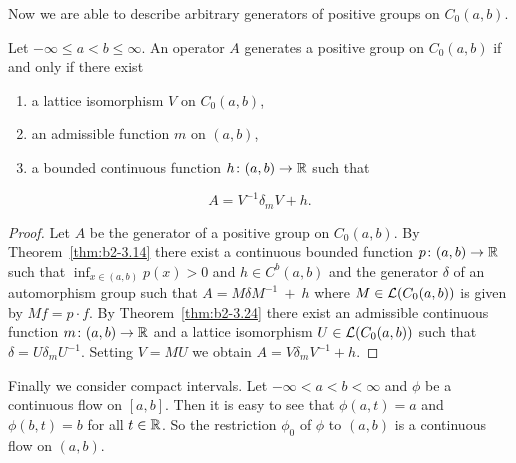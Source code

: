 Now we are able to describe arbitrary generators of positive groups on $C_{0}(a,b)$.
\begin{theorem}\label{thm:b2-3.25}
%
Let $-\infty \leq a < b \leq \infty$.
An operator $A$ generates a positive group on $C_{0}(a,b)$ if and only if there exist
\begin{enumerate}[\upshape (i)]
\item 
a lattice isomorphism $V$ on $C_{0}(a,b)$,
\item 
an admissible function $m$ on $(a,b)$,
\item 
a bounded continuous function $h \colon (a,b) \to \mathbb{R}$ such that
\end{enumerate}
\begin{equation}\label{eq:b2-3.24}
A = V^{-1}\delta_{m}V + h.
\end{equation}
\end{theorem}
\begin{proof}
Let $A$ be the generator of a positive group on $C_{0}(a,b)$.
By Theorem~\ref{thm:b2-3.14} 
there exist a continuous bounded function $p \colon (a,b) \to \mathbb{R}$ such that $\inf_{x \in (a,b)} p(x) > 0$ and $h \in C^{b}(a,b)$ 
and the generator $\delta$ of an automorphism group such that $A = M\delta M^{-1}~+~h$ 
where $M \in \mathcal{L}(C_{0}(a,b))$ is given by $Mf = p \cdot f$.
By Theorem~\ref{thm:b2-3.24} there exist an admissible continuous function $m \colon (a,b) \to \mathbb{R}$ and a lattice isomorphism $U \in \mathcal{L}(C_{0}(a,b))$ such that $\delta = U\delta_{m}U^{-1}$.
Setting $V = MU$ we obtain $A = V\delta_{m}V^{-1} + h$.
\end{proof}
Finally we consider compact intervals.
Let $-\infty < a < b < \infty$ and $\phi$ be a continuous flow on $[a,b]$.
Then it is easy to see that $\phi(a,t) = a$ and $\phi(b,t) = b$ for all $t \in \mathbb{R}$.
So the restriction $\phi_{0}$ of\/ $\phi$ to $(a,b)$ is a continuous flow on $(a,b)$.

